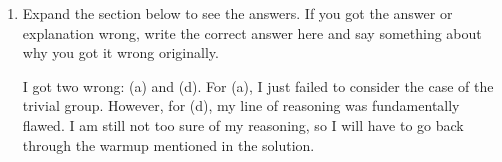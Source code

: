 \documentclass{article}
\begin{document}
\begin{enumerate}
{\begin{enumerate}
            \item {
                If \(G\) is a finite group with \(|G| \geq 3\) and \(H\) is an infinite group, then any homomorphism \(\varphi\colon G \to H\) fails to be one-to-one.
                
                False. This is from set theory.
            }
        \end{enumerate}
    }

    \item {
        Expand the section below to see the answers. If you got the answer or explanation wrong, write the correct answer here and say something about why you got it wrong originally.
      
        I got two wrong: (a) and (d).
        For (a), I just failed to consider the case of the trivial group.
        However, for (d), my line of reasoning was fundamentally flawed. I am still 
        not too sure of my reasoning, so I will have to go back through the warmup
        mentioned in the solution.
    }
\end{enumerate}
\end{document}
